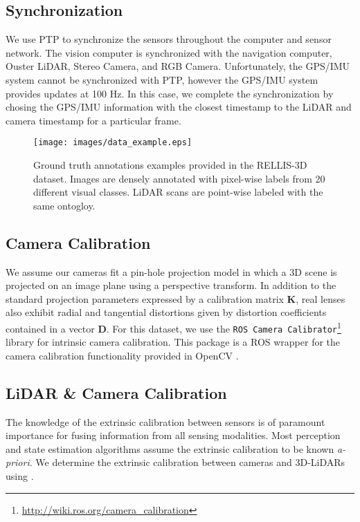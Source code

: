 \documentclass[letterpaper, 10 pt, conference]{ieeeconf}
\begin{document}
\subsection{Synchronization}
We use PTP to synchronize the sensors throughout the computer and sensor network. The vision computer is synchronized with the navigation computer, Ouster LiDAR, Stereo Camera, and RGB Camera. Unfortunately, the GPS/IMU system cannot be synchronized with PTP, however the GPS/IMU system provides updates at 100 Hz. In this case, we complete the synchronization by chosing the GPS/IMU information with the closest timestamp to the LiDAR and camera timestamp for a particular frame.
\begin{figure*}
\vspace{5pt}
  \centering
  \texttt{[image: images/data\_example.eps]}
  \caption{Ground truth annotations examples provided in the RELLIS-3D dataset. Images are densely annotated with pixel-wise labels from 20 different visual classes. LiDAR scans are point-wise labeled with the same ontogloy.}
  \label{fig:data_exp}
\end{figure*} \subsection{Camera Calibration}
We assume our cameras fit a pin-hole projection model in which a 3D scene is projected on an image plane using a perspective transform. In addition to the standard projection parameters expressed by a calibration matrix $\textbf{K}$, real lenses also exhibit radial and tangential distortions given by distortion coefficients contained in a vector $\textbf{D}$. For this dataset, we use the \texttt{ROS Camera Calibrator}\footnote{\url{http://wiki.ros.org/camera_calibration}} library for intrinsic camera calibration. This package is a ROS wrapper for the camera calibration functionality provided in OpenCV \cite{opencvlibrary}. 

\subsection{LiDAR \& Camera Calibration}
The knowledge of the extrinsic calibration between sensors is of paramount importance for fusing information from all sensing modalities. Most perception and state estimation algorithms assume the extrinsic calibration to be known \emph{a-priori}. We determine the extrinsic calibration between cameras and 3D-LiDARs using \cite{PBPC,mishra2020experimental,osteen_2105}.
\end{document}
